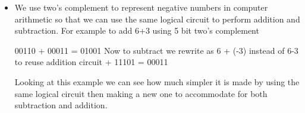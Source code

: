\documentclass{article}
\begin{document}
\begin{itemize}
    \item We use two's complement to represent negative numbers in computer arithmetic so that we can use the same logical circuit to perform addition and subtraction. For example to add 6+3 using 5 bit two's complement 
    
    00110 + 00011 = 01001\newline
    Now to subtract we rewrite as 6 + (-3) instead of 6-3 to reuse addition circuit  + 11101 = 00011\newline
    
    Looking at this example we can see how much simpler it is made by using the same logical circuit then making a new one to accommodate for both subtraction and addition. 
    
\end{itemize}
\end{document}
